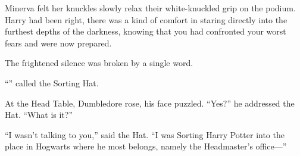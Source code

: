 Minerva felt her knuckles slowly relax their white-knuckled grip on the podium. Harry had been right, there was a kind of comfort in staring directly into the furthest depths of the darkness, knowing that you had confronted your worst fears and were now prepared.

The frightened silence was broken by a single word.

“” called the Sorting Hat.

At the Head Table, Dumbledore rose, his face puzzled. “Yes?” he addressed the Hat. “What is it?”

“I wasn’t talking to you,” said the Hat. “I was Sorting Harry Potter into the place in Hogwarts where he most belongs, namely the Headmaster’s office—”



